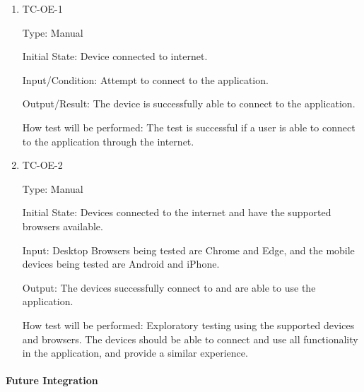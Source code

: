 \documentclass[12pt, titlepage]{article}
\begin{document}
\begin{enumerate}

  \item{TC-OE-1\\}

    Type: Manual

    Initial State: Device connected to internet.

    Input/Condition: Attempt to connect to the application.

    Output/Result: The device is successfully able to connect to the
    application.

    How test will be performed: The test is successful if a user is
    able to connect to the application through the internet.

  \item{TC-OE-2\\}

    Type: Manual

    Initial State: Devices connected to the internet and have the
    supported browsers available.

    Input: Desktop Browsers being tested are Chrome and Edge, and the
    mobile devices being tested are Android and iPhone.

    Output: The devices successfully connect to and are able to use
    the application.

    How test will be performed: Exploratory testing using the
    supported devices and browsers. The devices should be able to
    connect and use all functionality in the application, and provide
    a similar experience.

\end{enumerate}

\paragraph{Future Integration}

\end{document}
